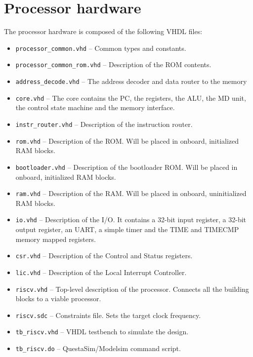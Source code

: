 \documentclass[12pt]{article}
\begin{document}
\section{Processor hardware}
The processor hardware is composed of the following VHDL files:

\begin{itemize}
\item \lstinline|processor_common.vhd| -- Common types and constants.
\item \lstinline|processor_common_rom.vhd| -- Description of the ROM contents.
\item \lstinline|address_decode.vhd| -- The address decoder and data router to the memory \item \lstinline|core.vhd| -- The core contains the PC, the registers, the ALU, the MD unit, the control state machine and the memory interface.
\item \lstinline|instr_router.vhd| -- Description of the instruction router.
\item \lstinline|rom.vhd| -- Description of the ROM. Will be placed in onboard, initialized RAM blocks. 
\item \lstinline|bootloader.vhd| -- Description of the bootloader ROM. Will be placed in onboard, initialized RAM blocks. 
\item \lstinline|ram.vhd| -- Description of the RAM. Will be placed in onboard, uninitialized RAM blocks. 
\item \lstinline|io.vhd| -- Description of the I/O. It contains a 32-bit input register, a 32-bit output register, an UART, a simple timer and the TIME and TIMECMP memory mapped registers.
\item \lstinline|csr.vhd| -- Description of the Control and Status registers.
\item \lstinline|lic.vhd| -- Description of the Local Interrupt Controller.
\item \lstinline|riscv.vhd| -- Top-level description of the processor. Connects all the building blocks to a viable processor.
\item \lstinline|riscv.sdc| -- Constraints file. Sets the target clock frequency.
\item \lstinline|tb_riscv.vhd| -- VHDL testbench to simulate the design.
\item \lstinline|tb_riscv.do| -- QuestaSim/Modelsim command script.
\end{itemize}
\end{document}
